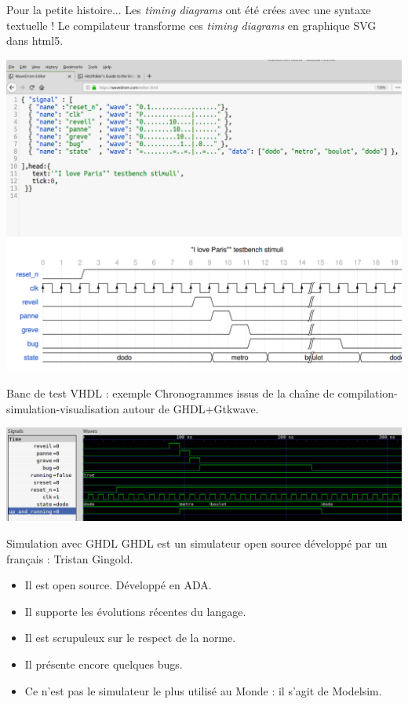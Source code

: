 \documentclass[xcolor=table]{beamer} %
\begin{document}
\begin{frame}{Pour la petite histoire...}
  Les {\it timing diagrams} ont été crées avec une syntaxe textuelle ! Le compilateur
  transforme ces {\it timing diagrams} en graphique SVG dans html5.
  \begin{center}
  \begin{minipage}[t]{19cm}
   \includegraphics[scale=0.17]{./figures/wave_drom_ex.png}
  \end{minipage}
  \end{center}
\end{frame}

\begin{frame}{Banc de test VHDL : exemple}
  Chronogrammes issus de la chaîne de compilation-simulation-visualisation autour de GHDL+Gtkwave.
  \begin{center}
  \begin{minipage}[t]{19cm}
   \includegraphics[scale=0.32]{./figures/metro_boulot_dodo_chrono.png}
  \end{minipage}
  \end{center}
\end{frame}

\begin{frame}{Simulation avec GHDL}
  GHDL est un simulateur open source développé par un français : Tristan Gingold.
  \begin{itemize}
    \item Il est open source. Développé en ADA.
    \item Il supporte les évolutions récentes du langage.
    \item Il est scrupuleux sur le respect de la norme.
    \item Il présente encore quelques bugs.
    \item Ce n'est pas le simulateur le plus utilisé au Monde : il s'agit de Modelsim.
  \end{itemize}
\end{frame}
\end{document}
